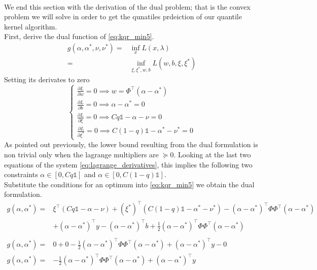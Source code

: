 \\
We end this section with the derivation of the dual problem; that is the convex problem we will solve in order to get the qunatiles prdeiction of our quantile kernel algorithm.
\\
First, derive the dual function of \ref{eq:kqr_min5}.
\begin{equation}
    \begin{aligned}
        g(\alpha, \alpha^*, \nu, \nu^*)=& \inf_x L(x,\lambda)\\
    = & \inf_{\xi, \xi^*, w, b} L(w,b,\xi,\xi^*)
\end{aligned}
\end{equation}
Setting its derivates to zero
\begin{equation}\label{eq:lagrange_derivatives}
    \begin{cases}
        \frac{\partial L}{\partial w}=0 \implies w=\Phi^\intercal(\alpha-\alpha^*)
        \\
        \frac{\partial L}{\partial b}=0 \implies \alpha-\alpha^*=0
        \\
        \frac{\partial L}{\partial \xi}=0 \implies Cq \mathbb{1}-\alpha- \nu=0
        \\
        \frac{\partial L}{\partial \xi^*}=0 \implies C(1-q)\mathbb{1} -\alpha^* -\nu^*=0
    \end{cases}
\end{equation}
As pointed out previously, the lower bound resulting from the dual formulation is non trivial only when the lagrange multipliers are $\succeq 0$. Looking at the last two equations of the system \ref{eq:lagrange_derivatives}, this implies the following two constraints $\alpha \in [0, Cq\mathbb{1}]$ and $\alpha \in [0, C(1-q)\mathbb{1}]$.
\\
Substitute the conditions for an optimum into \ref{eq:kqr_min5} we obtain the dual formulation.
\begin{equation}
    \begin{aligned}
        g(\alpha, \alpha^*)=& \xi^\intercal(Cq\mathbb{1}-\alpha -\nu)+(\xi^*)^\intercal(C(1-q)\mathbb{1}-\alpha^*-\nu^*)-(\alpha-\alpha^*)^\intercal \Phi\Phi^\intercal(\alpha-\alpha^*)
        \\
        & +(\alpha-\alpha^*)^\intercal y-(\alpha-\alpha^*)^\intercal b+\frac{1}{2}(\alpha-\alpha^*)^\intercal \Phi\Phi^\intercal(\alpha-\alpha^*)
        \\
        \\
        g(\alpha, \alpha^*)=& 0+0-\frac{1}{2}(\alpha-\alpha^*)^\intercal \Phi\Phi^\intercal(\alpha-\alpha^*)+(\alpha-\alpha^*)^\intercal y-0
        \\
        g(\alpha, \alpha^*)=& -\frac{1}{2}(\alpha-\alpha^*)^\intercal \Phi\Phi^\intercal(\alpha-\alpha^*)+(\alpha-\alpha^*)^\intercal y
    \end{aligned}
\end{equation}
